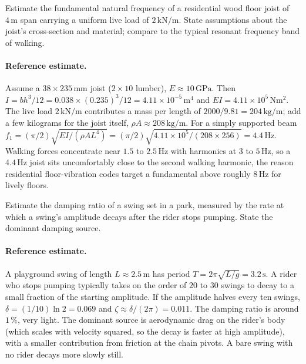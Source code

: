 \begin{exercise}
Estimate the fundamental natural frequency of a residential wood
floor joist of $4\,\si{\meter}$ span carrying a uniform live load
of $2\,\text{kN}/\text{m}$. State assumptions about the joist's
cross-section and material; compare to the typical resonant
frequency band of walking.

\paragraph{Reference estimate.} Assume a $38 \times 235\,\si{\milli
\meter}$ joist ($2\times 10$ lumber), $E \approx 10\,\text{GPa}$. Then
$I = bh^3/12 = 0.038 \times (0.235)^3/12 = 4.11 \times 10^{-5}\,\si{
\meter\tothe{4}}$ and $EI = 4.11 \times 10^5\,\si{\newton\meter
\squared}$. The live load $2\,\text{kN}/\text{m}$ contributes a mass
per length of $2000/9.81 = 204\,\si{\kilogram\per\meter}$; add a few
kilograms for the joist itself, $\rho A \approx 208\,\si{\kilogram\per
\meter}$. For a simply supported beam $f_1 = (\pi/2)\sqrt{EI/(\rho A
L^4)} = (\pi/2)\sqrt{4.11\times 10^5/(208 \times 256)} = 4.4\,\si{
\hertz}$. Walking forces concentrate near $1.5$ to $2.5\,\si{\hertz}$
with harmonics at $3$ to $5\,\si{\hertz}$, so a $4.4\,\si{\hertz}$
joist sits uncomfortably close to the second walking harmonic, the
reason residential floor-vibration codes target a fundamental above
roughly $8\,\si{\hertz}$ for lively floors.
\end{exercise}

\begin{exercise}
Estimate the damping ratio of a swing set in a park, measured by
the rate at which a swing's amplitude decays after the rider stops
pumping. State the dominant damping source.

\paragraph{Reference estimate.} A playground swing of length $L
\approx 2.5\,\si{\meter}$ has period $T = 2\pi\sqrt{L/g} = 3.2\,\si{
\second}$. A rider who stops pumping typically takes on the order of
$20$ to $30$ swings to decay to a small fraction of the starting
amplitude. If the amplitude halves every ten swings, $\delta =
(1/10)\ln 2 = 0.069$ and $\zeta \approx \delta/(2\pi) = 0.011$. The
damping ratio is around $1\,\%$, very light. The dominant source is
aerodynamic drag on the rider's body (which scales with velocity
squared, so the decay is faster at high amplitude), with a smaller
contribution from friction at the chain pivots. A bare swing with no
rider decays more slowly still.
\end{exercise}

